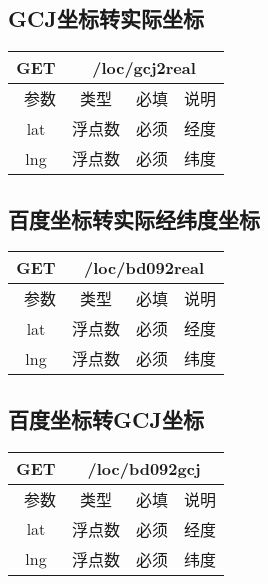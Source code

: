 \documentclass[cs4size]{ctexartutf8}
\begin{document}
\subsection{GCJ坐标转实际坐标}

\begin{table}[H]
   \begin{center}
\begin{tabular}{|c|c|c|p{12cm}|}
\hline
GET & \multicolumn{3}{|c|}{/loc/gcj2real} \\
\hline\hline
 \  参数  & 类型 & 必填 &  说明  \\
\hline
 lat  & 浮点数 & 必须 & 经度\\
\hline
 lng  &  浮点数 & 必须 & 纬度\\ 
\hline
\end{tabular}
   \end{center}
\end{table}



\subsection{百度坐标转实际经纬度坐标}

\begin{table}[H]
   \begin{center}
\begin{tabular}{|c|c|c|p{12cm}|}
\hline
GET & \multicolumn{3}{|c|}{/loc/bd092real} \\
\hline\hline
 \  参数  & 类型 & 必填 &  说明  \\
\hline
 lat  & 浮点数 & 必须 & 经度\\
\hline
 lng  &  浮点数 & 必须 & 纬度\\ 
\hline
\end{tabular}
   \end{center}
\end{table}



\subsection{百度坐标转GCJ坐标}

\begin{table}[H]
   \begin{center}
\begin{tabular}{|c|c|c|p{12cm}|}
\hline
GET & \multicolumn{3}{|c|}{/loc/bd092gcj} \\
\hline\hline
 \  参数  & 类型 & 必填 &  说明  \\
\hline
 lat  & 浮点数 & 必须 & 经度\\
\hline
 lng  &  浮点数 & 必须 & 纬度\\ 
\hline
\end{tabular}
   \end{center}
\end{table}
\end{document}
